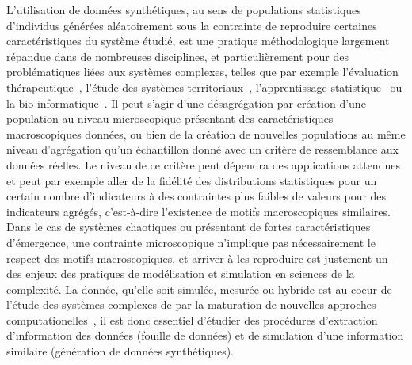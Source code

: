 {L'utilisation de données synthétiques, au sens de populations statistiques d'individus générées aléatoirement sous la contrainte de reproduire certaines caractéristiques du système étudié, est une pratique méthodologique largement répandue dans de nombreuses disciplines, et particulièrement pour des problématiques liées aux systèmes complexes, telles que par exemple l'évaluation thérapeutique~\cite{abadie2010synthetic}, l'étude des systèmes territoriaux~\cite{moeckel2003creating,pritchard2009advances}, l'apprentissage statistique~\cite{bolon2013review} ou la bio-informatique~\cite{van2006syntren}. Il peut s'agir d'une désagrégation par création d'une population au niveau microscopique présentant des caractéristiques macroscopiques données, ou bien de la création de nouvelles populations au même niveau d'agrégation qu'un échantillon donné avec un critère de ressemblance aux données réelles.  Le niveau de ce critère peut dépendra des applications attendues et peut par exemple aller de la fidélité des distributions statistiques pour un certain nombre d'indicateurs à des contraintes plus faibles de valeurs pour des indicateurs agrégés, c'est-à-dire l'existence de motifs macroscopiques similaires. Dans le cas de systèmes chaotiques ou présentant de fortes caractéristiques d'émergence, une contrainte microscopique n'implique pas nécessairement le respect des motifs macroscopiques, et arriver à les reproduire est justement un des enjeux des pratiques de modélisation et simulation en sciences de la complexité. La donnée, qu'elle soit simulée, mesurée ou hybride est au coeur de l'étude des systèmes complexes de par la maturation de nouvelles approches computationelles~\cite{arthur2015complexity}, il est donc essentiel d'étudier des procédures d'extraction d'information des données (fouille de données) et de simulation d'une information similaire (génération de données synthétiques).
}




